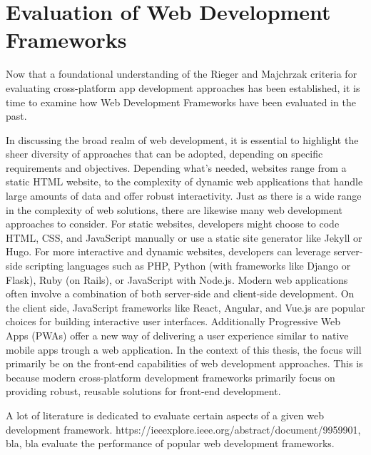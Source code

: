 \section{Evaluation of Web Development Frameworks}
Now that a foundational understanding of the Rieger and Majchrzak criteria for evaluating cross-platform app development approaches has been established, it is time to examine how Web Development Frameworks have been evaluated in the past. 

In discussing the broad realm of web development, it is essential to highlight the sheer diversity of approaches that can be adopted, depending on specific requirements and objectives. Depending what's needed, websites range from a static HTML website, to the complexity of dynamic web applications that handle large amounts of data and offer robust interactivity.
Just as there is a wide range in the complexity of web solutions, there are likewise many web development approaches to consider. For static websites, developers might choose to code HTML, CSS, and JavaScript manually or use a static site generator like Jekyll or Hugo. For more interactive and dynamic websites, developers can leverage server-side scripting languages such as PHP, Python (with frameworks like Django or Flask), Ruby (on Rails), or JavaScript with Node.js.
Modern web applications often involve a combination of both server-side and client-side development. On the client side, JavaScript frameworks like React, Angular, and Vue.js are popular choices for building interactive user interfaces. Additionally Progressive Web Apps (PWAs) offer a new way of delivering a user experience similar to native mobile apps trough a web application.
In the context of this thesis, the focus will primarily be on the front-end capabilities of web development approaches. This is because modern cross-platform development frameworks primarily focus on providing robust, reusable solutions for front-end development.

A lot of literature is dedicated to evaluate certain aspects of a given web development framework. 
https://ieeexplore.ieee.org/abstract/document/9959901, bla, bla 
evaluate the performance of popular web development frameworks. 

